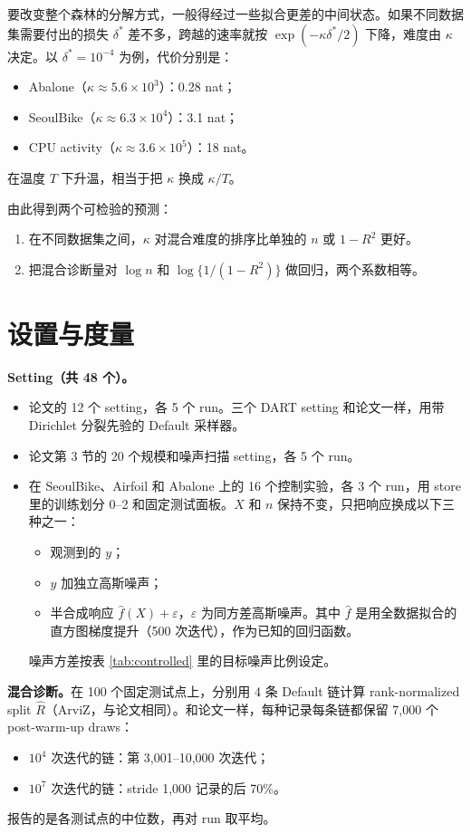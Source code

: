 \documentclass[11pt]{article}
\newcommand{\Rhat}{\hat R}
\begin{document}
要改变整个森林的分解方式，一般得经过一些拟合更差的中间状态。如果不同数据集需要付出的损失 $\delta^\ast$ 差不多，跨越的速率就按 $\exp(-\kappa\delta^\ast/2)$ 下降，难度由 $\kappa$ 决定。以 $\delta^\ast=10^{-4}$ 为例，代价分别是：
\begin{itemize}
\item Abalone（$\kappa\approx5.6\times10^3$）：0.28 nat；
\item SeoulBike（$\kappa\approx6.3\times10^4$）：3.1 nat；
\item CPU activity（$\kappa\approx3.6\times10^5$）：18 nat。
\end{itemize}
在温度 $T$ 下升温，相当于把 $\kappa$ 换成 $\kappa/T$。

由此得到两个可检验的预测：
\begin{enumerate}
\item 在不同数据集之间，$\kappa$ 对混合难度的排序比单独的 $n$ 或 $1-R^2$ 更好。
\item 把混合诊断量对 $\log n$ 和 $\log\{1/(1-R^2)\}$ 做回归，两个系数相等。
\end{enumerate}

\section{设置与度量}
\textbf{Setting（共 48 个）。}
\begin{itemize}
\item 论文的 12 个 setting，各 5 个 run。三个 DART setting 和论文一样，用带 Dirichlet 分裂先验的 Default 采样器。
\item 论文第 3 节的 20 个规模和噪声扫描 setting，各 5 个 run。
\item 在 SeoulBike、Airfoil 和 Abalone 上的 16 个控制实验，各 3 个 run，用 store 里的训练划分 0--2 和固定测试面板。$X$ 和 $n$ 保持不变，只把响应换成以下三种之一：
\begin{itemize}
\item 观测到的 $y$；
\item $y$ 加独立高斯噪声；
\item 半合成响应 $\hat f(X)+\varepsilon$，$\varepsilon$ 为同方差高斯噪声。其中 $\hat f$ 是用全数据拟合的直方图梯度提升（500 次迭代），作为已知的回归函数。
\end{itemize}
噪声方差按表 \ref{tab:controlled} 里的目标噪声比例设定。
\end{itemize}

\textbf{混合诊断。}在 100 个固定测试点上，分别用 4 条 Default 链计算 rank-normalized split $\Rhat$（ArviZ，与论文相同）。和论文一样，每种记录每条链都保留 7,000 个 post-warm-up draws：
\begin{itemize}
\item $10^4$ 次迭代的链：第 3,001--10,000 次迭代；
\item $10^7$ 次迭代的链：stride 1,000 记录的后 70\%。
\end{itemize}
报告的是各测试点的中位数，再对 run 取平均。
\end{document}
